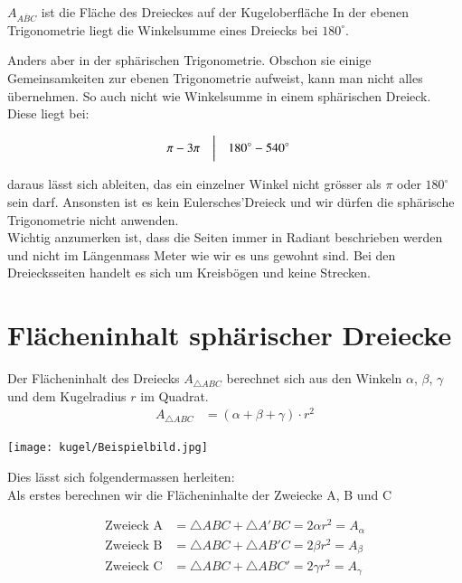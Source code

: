\begin{refsection}
$A_{ \overline{ ABC }}$ ist die Fläche des Dreieckes auf der Kugeloberfläche
In der ebenen Trigonometrie liegt die Winkelsumme eines Dreiecks bei
$180^{\circ}$.

Anders aber in der sphärischen Trigonometrie. Obschon sie einige Gemeinsamkeiten zur ebenen Trigonometrie aufweist, kann man nicht alles übernehmen.
So auch nicht wie Winkelsumme in einem sphärischen Dreieck.
Diese liegt bei:

\[
\begin{aligned}
\pi
&-
3\pi
&
&\text{\bigg \vert}
&
180^{\circ}
&-
540^{\circ}
\end{aligned}
\]

daraus lässt sich ableiten, das ein einzelner Winkel nicht grösser als $\pi$ oder $180^{\circ}$ sein darf. Ansonsten ist es kein Eulersches’Dreieck und wir dürfen die sphärische Trigonometrie nicht anwenden.\\
Wichtig anzumerken ist, dass die Seiten immer in Radiant beschrieben werden und nicht im Längenmass Meter wie wir es uns gewohnt sind. 
Bei den Dreiecksseiten handelt es sich um Kreisbögen und keine Strecken.

\section{Flächeninhalt sphärischer Dreiecke}

Der Flächeninhalt des Dreiecks $A_{ \triangle{ ABC }}$ berechnet sich aus den Winkeln $\alpha$, $\beta$, $\gamma$ und dem Kugelradius $r$ im Quadrat.
\begin{align*}
A_{ \triangle{ ABC }} &= (\alpha + \beta + \gamma) \cdot r^2
\end{align*}

\begin{center}
        \texttt{[image: kugel/Beispielbild.jpg]}
\end{center}

Dies lässt sich folgendermassen herleiten: \\
Als erstes berechnen wir die Flächeninhalte der Zweiecke A, B und C

\begin{align*}
\text{Zweieck A}
&=
\triangle{ABC} + \triangle{A'BC} = 2 \alpha r^{ 2 } = A_{ \alpha }\\
\text{Zweieck B}
&=
\triangle{ABC} + \triangle{AB'C} = 2 \beta r^{ 2 } = A_{ \beta }\\
\text{Zweieck C}
&=
\triangle{ABC} + \triangle{ABC'} = 2 \gamma r^{ 2 } = A_{ \gamma }
\end{align*}


\end{refsection}
